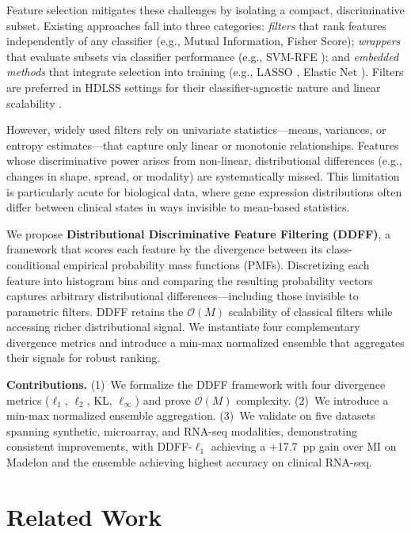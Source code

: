 \documentclass[conference]{IEEEtran}
\begin{document}
Feature selection mitigates these challenges by isolating a compact, discriminative subset. Existing approaches fall into three categories: \emph{filters} that rank features independently of any classifier (e.g., Mutual Information, Fisher Score); \emph{wrappers} that evaluate subsets via classifier performance (e.g., SVM-RFE \cite{Guyon2002SVMRFE}); and \emph{embedded methods} that integrate selection into training (e.g., LASSO \cite{Tibshirani1996LASSO}, Elastic Net \cite{Zou2005ElasticNet}). Filters are preferred in HDLSS settings for their classifier-agnostic nature and linear scalability \cite{tsai2020ensemble, mandal2024feature}.

However, widely used filters rely on univariate statistics---means, variances, or entropy estimates---that capture only linear or monotonic relationships. Features whose discriminative power arises from non-linear, distributional differences (e.g., changes in shape, spread, or modality) are systematically missed. This limitation is particularly acute for biological data, where gene expression distributions often differ between clinical states in ways invisible to mean-based statistics.

We propose \textbf{Distributional Discriminative Feature Filtering (DDFF)}, a framework that scores each feature by the divergence between its class-conditional empirical probability mass functions (PMFs). Discretizing each feature into histogram bins and comparing the resulting probability vectors captures arbitrary distributional differences---including those invisible to parametric filters. DDFF retains the $\mathcal{O}(M)$ scalability of classical filters while accessing richer distributional signal. We instantiate four complementary divergence metrics and introduce a min-max normalized ensemble that aggregates their signals for robust ranking.

\noindent\textbf{Contributions.} (1)~We formalize the DDFF framework with four divergence metrics ($\ell_1$, $\ell_2$, KL, $\ell_\infty$) and prove $\mathcal{O}(M)$ complexity. (2)~We introduce a min-max normalized ensemble aggregation. (3)~We validate on five datasets spanning synthetic, microarray, and RNA-seq modalities, demonstrating consistent improvements, with DDFF-$\ell_1$ achieving a +17.7~pp gain over MI on Madelon and the ensemble achieving highest accuracy on clinical RNA-seq.

\section{Related Work}
\label{sec:related}
\end{document}
